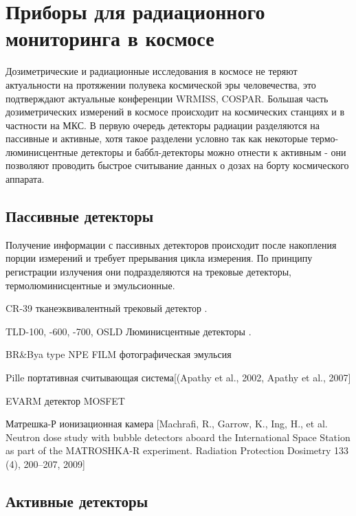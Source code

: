 
\section{Приборы для радиационного мониторинга в космосе} \label{sect1_3}

Дозиметрические и радиационные исследования в космосе не теряют актуальности на протяжении полувека космической эры человечества, это подтверждают актуальные  конференции WRMISS, COSPAR. Большая часть дозиметрических измерений в космосе происходит на космических станциях и в частности на МКС. 
В первую очередь детекторы радиации разделяются на пассивные и активные, хотя такое разделени условно так как некоторые термо-люминисцентные детекторы и баббл-детекторы можно отнести к активным - они позволяют проводить быстрое считывание данных о дозах на борту космического аппарата. 

\subsection{Пассивные детекторы} \label{subsect1_3_1}

Получение информации с пассивных детекторов происходит после накопления порции измерений и требует прерывания цикла измерения. По принципу регистрации излучения они подразделяются на трековые детекторы, термолюминисцентные и эмульсионные.


CR-39 тканеэквивалентный трековый детектор \cite{Zhou2008}.


TLD-100, -600, -700, OSLD Люминисцентные детекторы \cite{Zhou2010}.


BR\&Bya type NPE FILM фотографическая эмульсия


Pille портативная считывающая система[(Apathy et al., 2002, Apathy et al., 2007]


EVARM детектор MOSFET 


Матрешка-Р ионизационная камера [Machrafi, R., Garrow, K., Ing, H., et al. Neutron dose study with bubble detectors aboard the International Space Station as part of the MATROSHKA-R experiment. Radiation Protection Dosimetry 133 (4), 200--207, 2009]



\subsection{Активные детекторы} \label{subsect1_3_2}

